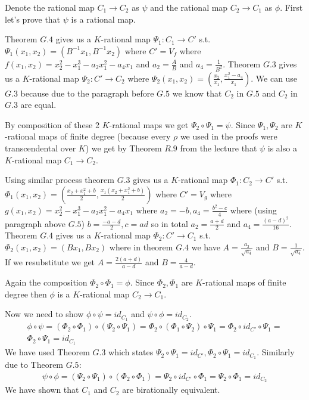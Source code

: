 \documentclass[12pt, a4paper]{article}
\begin{document}
Denote the rational map $C_1 \rightarrow C_2$ as $\psi$ and the rational map $C_2 \rightarrow C_1$ as $\phi$. First let's prove that $\psi$ is a rational map.

Theorem $G.4$ gives us a $K$-rational map $\Psi_1: C_1 \rightarrow C'$ s.t. $\Psi_1(x_1, x_2) = (B^{-1}x_1, B^{-1}x_2)$ where $C' = V_f$ where $f(x_1, x_2) = x_2^2-x_1^3-a_2x_1^2-a_4x_1$ and $a_2 = \frac{A}{B}$ and $a_4 = \frac{1}{B^2}$. Theorem $G.3$ gives us a $K$-rational map $\Psi_2: C' \rightarrow C_2$ where $\Psi_2(x_1, x_2) = \left(\frac{x_2}{x_1}, \frac{x_1^2-a_4}{x_1} \right)$. We can use $G.3$ because due to the paragraph before $G.5$ we know that $C_2$ in $G.5$ and $C_2$ in $G.3$ are equal.

By composition of these 2 $K$-rational maps we get $\Psi_2 \circ \Psi_1 = \psi$. Since $\Psi_1, \Psi_2$ are $K$-rational maps of finite degree (because every $\rho$ we used in the proofs were transcendental over $K$) we get by Theorem $R.9$ from the lecture that $\psi$ is also a $K$-rational map $C_1 \rightarrow C_2$.

Using similar process theorem $G.3$ gives us a $K$-rational map $\Phi_1: C_2 \rightarrow C'$ s.t. $\Phi_1(x_1, x_2) = \left(\frac{x_2+x_1^2+b}{2}, \frac{x_1(x_2+x_1^2+b)}{2} \right)$ where $C' = V_g$ where $g(x_1,x_2) = x_2^2-x_1^3-a_2x_1^2-a_4x_1$ where $a_2 = -b, a_4 = \frac{b^2-c}{4}$ where (using paragraph above $G.5$) $b = \frac{-a-d}{2}, c = ad$ so in total $a_2 = \frac{a+d}{2}$ and $a_4 = \frac{(a-d)^2}{16}$. Theorem $G.4$ gives us a $K$-rational map $\Phi_2: C' \rightarrow C_1$ s.t. $\Phi_2(x_1, x_2) = (Bx_1, Bx_2)$ where in theorem $G.4$ we have $A = \frac{a_2}{\sqrt{a_4}}$ and $B = \frac{1}{\sqrt{a_4}}$. If we resubstitute we get $A = \frac{2(a+d)}{a-d}$ and $B = \frac{4}{a-d}$.

Again the composition $\Phi_2 \circ \Phi_1 = \phi$. Since $\Phi_2, \Phi_1$ are $K$-rational maps of finite degree then $\phi$ is a $K$-rational map $C_2 \rightarrow C_1$.

Now we need to show $\phi \circ \psi = id_{C_1}$ and $\psi \circ \phi = id_{C_2}$.
\begin{gather*}
\phi \circ \psi = (\Phi_2 \circ \Phi_1) \circ (\Psi_2 \circ \Psi_1) = \Phi_2 \circ (\Phi_1 \circ \Psi_2) \circ \Psi_1 = \Phi_2 \circ id_{C'} \circ \Psi_1 =\\
\Phi_2 \circ \Psi_1 = id_{C_1}
\end{gather*}
We have used Theorem $G.3$ which states $\Psi_2 \circ \Psi_1 = id_{C'}, \Phi_2 \circ \Psi_1 = id_{C_1}$. Similarly due to Theorem $G.5$:
\begin{gather*}
\psi \circ \phi = (\Psi_2 \circ \Psi_1) \circ (\Phi_2 \circ \Phi_1) = \Psi_2 \circ id_{C'} \circ \Phi_1 = \Psi_2 \circ \Phi_1 = id_{C_2}
\end{gather*}
We have shown that $C_1$ and $C_2$ are birationally equivalent.
\end{document}
